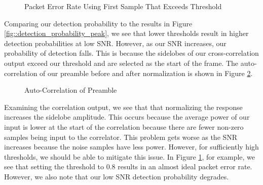 \documentclass{article}
\begin{document}
\begin{figure}[H]
	\centerline{}
	\caption{Packet Error Rate Using First Sample That Exceeds Threshold}
	\label{fig::per_first}
\end{figure}

\noindent Comparing our detection probability to the results in Figure \ref{fig::detection_probability_peak}, we see that lower thresholds result in higher detection probabilities at low SNR. However, as our SNR increases, our probability of detection falls. This is because the sidelobes of our cross-correlation output exceed our threshold and are selected as the start of the frame. The auto-correlation of our preamble before and after normalization is shown in Figure \ref{fig::auto_corr_preamble}.

\begin{figure}[H]
	\centerline{}
	\caption{Auto-Correlation of Preamble}
	\label{fig::auto_corr_preamble}
\end{figure}

\noindent Examining the correlation output, we see that that normalizing the response increases the sidelobe amplitude. This occurs because the average power of our input is lower at the start of the correlation because there are fewer non-zero samples being input to the correlator. This problem gets worse as the SNR increases because the noise samples have less power. However, for sufficiently high thresholds, we should be able to mitigate this issue. In Figure \ref{fig::per_first}, for example, we see that setting the threshold to 0.8 results in an almost ideal packet error rate. However, we also note that our low SNR detection probability degrades.
\end{document}
